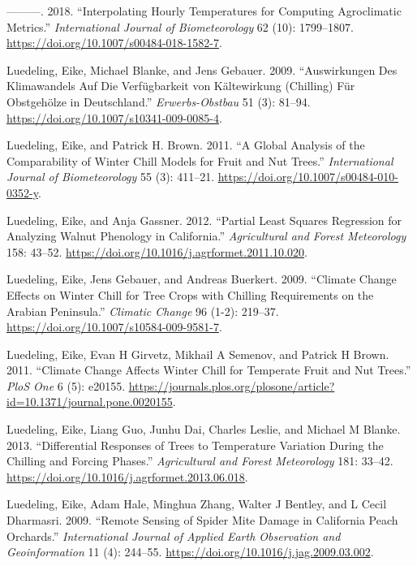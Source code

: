 \documentclass[
]{book}
\begin{document}
\leavevmode\hypertarget{ref-luedeling_interpolating_2018}{}%
---------. 2018. ``Interpolating Hourly Temperatures for Computing Agroclimatic Metrics.'' \emph{International Journal of Biometeorology} 62 (10): 1799--1807. \url{https://doi.org/10.1007/s00484-018-1582-7}.

\leavevmode\hypertarget{ref-luedeling_auswirkungen_2009}{}%
Luedeling, Eike, Michael Blanke, and Jens Gebauer. 2009. ``Auswirkungen Des Klimawandels Auf Die Verfügbarkeit von Kältewirkung (Chilling) Für Obstgehölze in Deutschland.'' \emph{Erwerbs-Obstbau} 51 (3): 81--94. \url{https://doi.org/10.1007/s10341-009-0085-4}.

\leavevmode\hypertarget{ref-luedeling_global_2011}{}%
Luedeling, Eike, and Patrick H. Brown. 2011. ``A Global Analysis of the Comparability of Winter Chill Models for Fruit and Nut Trees.'' \emph{International Journal of Biometeorology} 55 (3): 411--21. \url{https://doi.org/10.1007/s00484-010-0352-y}.

\leavevmode\hypertarget{ref-luedeling2012partial}{}%
Luedeling, Eike, and Anja Gassner. 2012. ``Partial Least Squares Regression for Analyzing Walnut Phenology in California.'' \emph{Agricultural and Forest Meteorology} 158: 43--52. \url{https://doi.org/10.1016/j.agrformet.2011.10.020}.

\leavevmode\hypertarget{ref-luedeling_climate_2009}{}%
Luedeling, Eike, Jens Gebauer, and Andreas Buerkert. 2009. ``Climate Change Effects on Winter Chill for Tree Crops with Chilling Requirements on the Arabian Peninsula.'' \emph{Climatic Change} 96 (1-2): 219--37. \url{https://doi.org/10.1007/s10584-009-9581-7}.

\leavevmode\hypertarget{ref-luedeling2011climate}{}%
Luedeling, Eike, Evan H Girvetz, Mikhail A Semenov, and Patrick H Brown. 2011. ``Climate Change Affects Winter Chill for Temperate Fruit and Nut Trees.'' \emph{PloS One} 6 (5): e20155. \url{https://journals.plos.org/plosone/article?id=10.1371/journal.pone.0020155}.

\leavevmode\hypertarget{ref-luedeling2013differential}{}%
Luedeling, Eike, Liang Guo, Junhu Dai, Charles Leslie, and Michael M Blanke. 2013. ``Differential Responses of Trees to Temperature Variation During the Chilling and Forcing Phases.'' \emph{Agricultural and Forest Meteorology} 181: 33--42. \url{https://doi.org/10.1016/j.agrformet.2013.06.018}.

\leavevmode\hypertarget{ref-luedeling2009remote}{}%
Luedeling, Eike, Adam Hale, Minghua Zhang, Walter J Bentley, and L Cecil Dharmasri. 2009. ``Remote Sensing of Spider Mite Damage in California Peach Orchards.'' \emph{International Journal of Applied Earth Observation and Geoinformation} 11 (4): 244--55. \url{https://doi.org/10.1016/j.jag.2009.03.002}.
\end{document}
